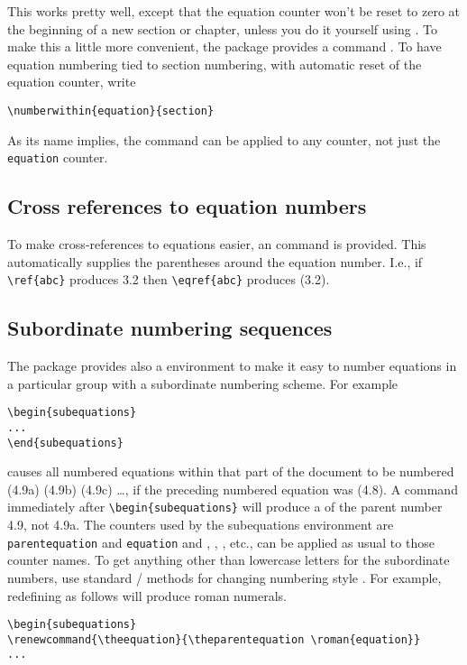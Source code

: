 \documentclass[leqno,titlepage,openany]{amsldoc}[1999/12/13]
\begin{document}
This works pretty well, except that the equation counter won't be reset
to zero at the beginning of a new section or chapter, unless you do it
yourself using . To make this a little more convenient,
the  package provides a command . To have equation numbering tied to
section numbering, with automatic reset of the equation counter, write
\begin{verbatim}
\numberwithin{equation}{section}
\end{verbatim}
As its name implies, the  command can be applied to
any counter, not just the \texttt{equation} counter.

\subsection{Cross references to equation numbers}

To make cross-references to equations easier, an 
command is provided. This
automatically supplies the parentheses around the equation number. I.e.,
if \verb'\ref{abc}' produces 3.2 then \verb'\eqref{abc}' produces
(3.2).

\subsection{Subordinate numbering sequences}

The  package provides also a 
environment to make it
easy to number equations in a particular group with a subordinate
numbering scheme. For example
\begin{verbatim}
\begin{subequations}
...
\end{subequations}
\end{verbatim}
causes all numbered equations within that part of the document to be
numbered (4.9a) (4.9b) (4.9c) \dots, if the preceding numbered
equation was (4.8). A  command immediately after
\verb/\begin{subequations}/ will produce a  of the parent
number 4.9, not 4.9a. The counters used by the subequations
environment are \verb/parentequation/ and \verb/equation/ and
, , , etc., can be applied
as usual to those counter names. To get anything other than lowercase
letters for the subordinate numbers, use standard \latex/ methods for
changing numbering style \cite[\S6.3, \S C.8.4]{lamport}. For example,
redefining  as follows will produce roman numerals.
\begin{verbatim}
\begin{subequations}
\renewcommand{\theequation}{\theparentequation \roman{equation}}
...
\end{verbatim}
\end{document}
